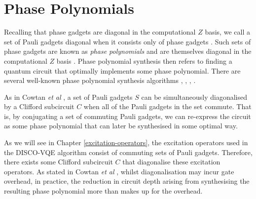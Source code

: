 \chapter{Phase Polynomials}%
\label{phase-polynomials}

Recalling that phase gadgets are diagonal in the computational $Z$ basis, we call a set of Pauli gadgets diagonal when it consists only of phase gadgets \cite{Cowtan2020}. Such sets of phase gadgets are known as \textit{phase polynomials} and are themselves diagonal in the computational $Z$ basis \cite{Cowtan2019}. Phase polynomial synthesis then refers to finding a quantum circuit that optimally implements some phase polynomial. There are several well-known phase polynomial synthesis algorithms \cite{Amy2013}, \cite{Amy2014}, \cite{Nam2018}, \cite{Maslov2018}.

As in Cowtan \textit{et al} \cite{Cowtan2020}, a set of Pauli gadgets $S$ can be simultaneously diagonalised by a Clifford subcircuit $C$ when all of the Pauli gadgets in the set commute. That is, by conjugating a set of commuting Pauli gadgets, we can re-express the circuit as some phase polynomial that can later be synthesised in some optimal way.


As we will see in Chapter \ref{excitation-operators}, the excitation operators used in the DISCO-VQE algorithm consist of commuting sets of Pauli gadgets. Therefore, there exists some Clifford subcircuit $C$ that diagonalise these excitation operators. As stated in Cowtan \textit{et al} \cite{Cowtan2020}, whilst diagonalisation may incur gate overhead, in practice, the reduction in circuit depth arising from synthesising the resulting phase polynomial more than makes up for the overhead.
